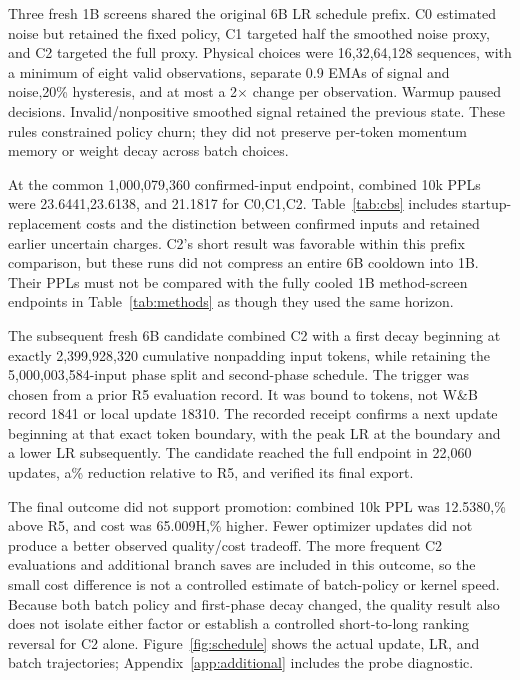 Three fresh 1B screens shared the original 6B LR schedule prefix. C0 estimated noise but retained the fixed policy, C1 targeted half the smoothed noise proxy, and C2 targeted the full proxy. Physical choices were 16,32,64,128 sequences, with a minimum of eight valid observations, separate 0.9 EMAs of signal and noise,20\% hysteresis, and at most a 2$\times$ change per observation. Warmup paused decisions. Invalid/nonpositive smoothed signal retained the previous state. These rules constrained policy churn; they did not preserve per-token momentum memory or weight decay across batch choices.

At the common 1,000,079,360 confirmed-input endpoint, combined 10k PPLs were 23.6441,23.6138, and 21.1817 for C0,C1,C2. Table~\ref{tab:cbs} includes startup-replacement costs and the distinction between confirmed inputs and retained earlier uncertain charges. C2's short result was favorable within this prefix comparison, but these runs did not compress an entire 6B cooldown into 1B. Their PPLs must not be compared with the fully cooled 1B method-screen endpoints in Table~\ref{tab:methods} as though they used the same horizon.



The subsequent fresh 6B candidate combined C2 with a first decay beginning at exactly 2,399,928,320 cumulative nonpadding input tokens, while retaining the 5,000,003,584-input phase split and second-phase schedule. The trigger was chosen from a prior R5 evaluation record. It was bound to tokens, not W\&B record 1841 or local update 18310. The recorded receipt confirms a next update beginning at that exact token boundary, with the peak LR at the boundary and a lower LR subsequently. The candidate reached the full endpoint in 22,060 updates, a\CtwoUpdateReduction\% reduction relative to R5, and verified its final export.

The final outcome did not support promotion: combined 10k PPL was 12.5380,\CtwoRegression\% above R5, and cost was 65.009H,\CtwoCostIncrease\% higher. Fewer optimizer updates did not produce a better observed quality/cost tradeoff. The more frequent C2 evaluations and additional branch saves are included in this outcome, so the small cost difference is not a controlled estimate of batch-policy or kernel speed. Because both batch policy and first-phase decay changed, the quality result also does not isolate either factor or establish a controlled short-to-long ranking reversal for C2 alone. Figure~\ref{fig:schedule} shows the actual update, LR, and batch trajectories; Appendix~\ref{app:additional} includes the probe diagnostic.

